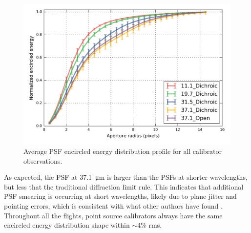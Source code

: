 \begin{figure}[!h]
\begin{center}
\includegraphics[width=\textwidth]{Figures/average.png}
\vspace{-0.5cm}
\caption[PSF size]{Average PSF encircled energy distribution profile for all calibrator observations.}
\label{fig:averageEE}
\end{center}
\end{figure}


As expected, the PSF at \SI{37.1}{\micro\meter} is larger than the PSFs at shorter wavelengths, but less that the traditional diffraction limit rule. This indicates that additional PSF smearing is occurring at short wavelengths, likely due to plane jitter and pointing errors, which is consistent with what other authors have found \citep[e.g.][]{Herter:2013by}. Throughout all the flights, point source calibrators always have the same encircled energy distribution shape within $\sim 4\%$ rms. 

